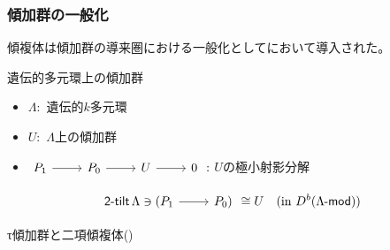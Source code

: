 \documentclass[dvipdfmx,10pt,handout
]{beamer}
\newcommand{\lmod}{\operatorname{\mathsf{\hspace{-2pt}-mod}}}
\newcommand{\twotilt}{\operatorname{\mathsf{2-tilt}}}
\begin{document}
\begin{frame}
    \frametitle{傾加群の一般化}
    傾複体は傾加群の導来圏における一般化として\cite{MR1002456}において導入された。
    \pause
    \begin{alertblock}{遺伝的多元環上の傾加群}
        \begin{itemize}
            \item \(\Lambda:\) 遺伝的\(k\)多元環
            \item \(U:\) \(\Lambda\)上の傾加群\pause
            \item \(\begin{tikzcd}[ampersand replacement=\&]\
                      \hspace{-4pt}%
                      P_1\ar[r] \& P_0\ar[r]\&U\ar[r]\&0
                  \end{tikzcd}:\) \(U\)の極小射影分解
        \end{itemize}\pause
        \[
            \begin{tikzcd}[ampersand replacement=\&]
                \twotilt \Lambda \ni (P_1\ar[r] \& P_0)
            \end{tikzcd}\cong U \quad \text{(in \(D^b(\Lambda\lmod)\))}
        \]        \end{alertblock}
    \pause
    \begin{block}{τ傾加群と二項傾複体(\cite*{MR3187626})}

\end{block}
\end{frame}
\end{document}
